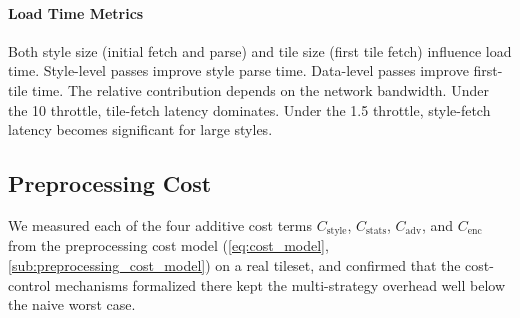 \paragraph{Load Time Metrics}
Both style size (initial fetch and parse) and tile size (first tile fetch) influence load time.
Style-level passes improve style parse time.
Data-level passes improve first-tile time.
The relative contribution depends on the network bandwidth.
Under the \qty{10}{\Mbps} throttle, tile-fetch latency dominates.
Under the \qty{1.5}{\Mbps} throttle, style-fetch latency becomes significant for large styles.

\subsection{Preprocessing Cost}\label{sub:preprocessing_cost}

We measured each of the four additive cost terms $C_\text{style}$, $C_\text{stats}$, $C_\text{adv}$, and $C_\text{enc}$ from the preprocessing cost model (\cref{eq:cost_model}, \cref{sub:preprocessing_cost_model}) on a real tileset, and confirmed that the cost-control mechanisms formalized there kept the multi-strategy overhead well below the naive worst case.


